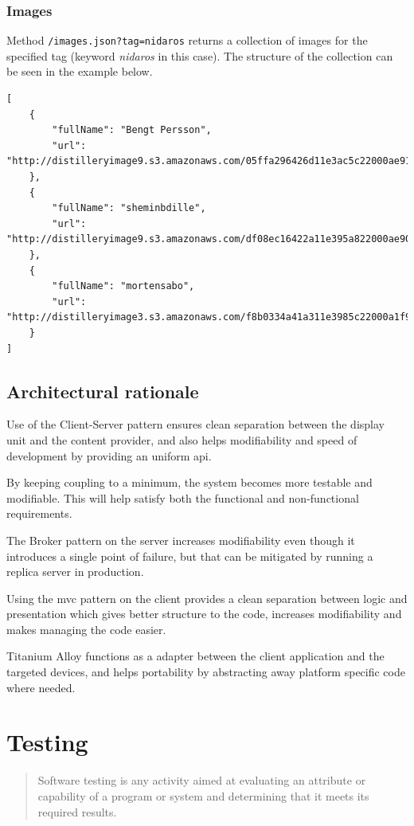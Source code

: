 \documentclass[11pt]{book}
\begin{document}
\subsection{Images}\label{imagesjson}
Method \texttt{/images.json?tag=nidaros} returns a collection of images for the specified tag (keyword \emph{nidaros} in this case). The structure of the collection can be seen in the example below.
\begin{lstlisting}[frame=single]
[
    {
        "fullName": "Bengt Persson",
        "url": "http://distilleryimage9.s3.amazonaws.com/05ffa296426d11e3ac5c22000ae91269_8.jpg"
    },
    {
        "fullName": "sheminbdille",
        "url": "http://distilleryimage9.s3.amazonaws.com/df08ec16422a11e395a822000ae90d43_7.jpg"
    },
    {
        "fullName": "mortensabo",
        "url": "http://distilleryimage3.s3.amazonaws.com/f8b0334a41a311e3985c22000a1f9ad3_8.jpg"
    }
]
\end{lstlisting}

\section{Architectural rationale}
Use of the Client-Server pattern ensures clean separation between the display unit and the content provider, and also helps modifiability and speed of development by providing an uniform \gls{api}.

By keeping coupling to a minimum, the system becomes more testable and modifiable. This will help satisfy both the functional and non-functional requirements.

The Broker pattern on the server increases modifiability even though it introduces a single point of failure, but that can be mitigated by running a replica server in production.

Using the \gls{mvc} pattern on the client provides a clean separation between logic and presentation which gives better structure to the code, increases modifiability and makes managing the code easier.

Titanium Alloy functions as a adapter between the client application and the targeted devices, and helps portability by abstracting away platform specific code where needed.

\chapter{Testing}

\begin{quotation}\noindent
Software testing is any activity aimed at evaluating an attribute or capability of a program or system and determining that it meets its required results. \cite{pan}
\end{quotation}
\end{document}
